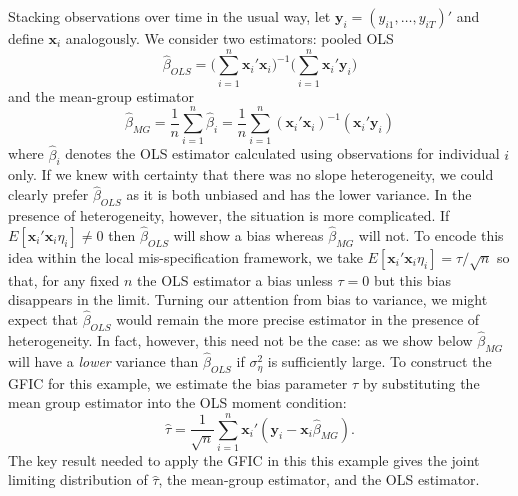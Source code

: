 Stacking observations over time in the usual way, let $\mathbf{y}_i = (y_{i1}, \ldots, y_{iT})'$ and define $\mathbf{x}_i$ analogously. 
We consider two estimators: pooled OLS
	\begin{equation}
\widehat{\beta}_{OLS} = \bigg(\sum_{i=1}^{n} \mathbf{x}_i'  \mathbf{x}_i\bigg)^{-1}\bigg(\sum_{i=1}^{n} \mathbf{x}_i' \mathbf{y}_i   \bigg)	
	\end{equation}
and the mean-group estimator
	\begin{equation}
\widehat{\beta}_{MG}  = \frac{1}{n}\sum_{i=1}^n \widehat{\beta}_i 
= \frac{1}{n} \sum_{i=1}^n \left( \mathbf{x}_i'  \mathbf{x}_i\right)^{-1}\left( \mathbf{x}_i'  \mathbf{y}_i   \right)
\end{equation}
where $\widehat{\beta}_i$ denotes the OLS estimator calculated using observations for individual $i$ only. 
If we knew with certainty that there was no slope heterogeneity, we could clearly prefer $\widehat{\beta}_{OLS}$ as it is both unbiased and has the lower variance.
In the presence of heterogeneity, however, the situation is more complicated.
If $E[\mathbf{x}_i' \mathbf{x}_i \eta_i]\neq 0$ then $\widehat{\beta}_{OLS}$ will show a bias whereas $\widehat{\beta}_{MG}$ will not.
To encode this idea within the local mis-specification framework, we take $E[\mathbf{x}_i'\mathbf{x}_i \eta_i] = \tau/\sqrt{n}$ so that, for any fixed $n$ the OLS estimator a bias unless $\tau = 0$ but this bias disappears in the limit.
Turning our attention from bias to variance, we might expect that $\widehat{\beta}_{OLS}$ would remain the more precise estimator in the presence of heterogeneity.
In fact, however, this need not be the case: as we show below $\widehat{\beta}_{MG}$ will have a \emph{lower} variance than $\widehat{\beta}_{OLS}$ if $\sigma_{\eta}^2$ is sufficiently large.
To construct the GFIC for this example, we estimate the bias parameter $\tau$ by substituting the mean group estimator into the OLS moment condition:
\begin{equation}
\widehat{\tau} = \frac{1}{\sqrt{n}} \sum_{i=1}^n \mathbf{x}_i' (\mathbf{y}_i - \mathbf{x}_i \widehat{\beta}_{MG}).
\end{equation}
The key result needed to apply the GFIC in this this example gives the joint limiting distribution of $\widehat{\tau}$, the mean-group estimator, and the OLS estimator.

